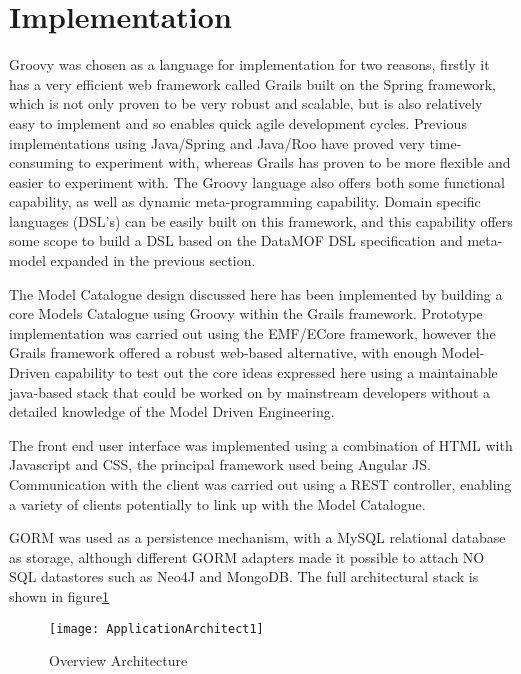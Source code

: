 \section{Implementation}

Groovy was chosen as a language for implementation for two reasons, firstly it has a very efficient web framework called Grails built on the Spring framework, which is not only proven to be very robust and scalable, but is also relatively easy to implement and so enables quick agile development cycles. Previous implementations using Java/Spring and Java/Roo have proved very time-consuming to experiment with, whereas Grails has proven to be more flexible and easier to experiment with. The Groovy language also offers both some functional capability, as well as dynamic meta-programming capability. Domain specific languages (DSL’s) can be easily built on this framework, and this capability offers some scope to build a DSL based on the DataMOF DSL specification and meta-model expanded in the previous section.
 
The Model Catalogue design discussed here has been implemented by building a core Models Catalogue using Groovy within the Grails framework. Prototype implementation was carried out using the EMF/ECore framework, however the Grails framework offered a robust web-based alternative, with enough Model-Driven capability to test out the core ideas expressed here using a maintainable java-based stack that could be worked on by mainstream developers without a detailed knowledge of the Model Driven Engineering. 

The front end user interface was implemented using a combination of HTML with Javascript and CSS, the principal framework used being Angular JS. Communication with the client was carried out using a REST controller, enabling a variety of clients potentially to link up with the Model Catalogue.

GORM was used as a persistence mechanism, with a MySQL relational database as storage, although different GORM adapters made it possible to attach NO SQL datastores such as Neo4J and MongoDB. The full architectural stack is shown in figure\ref{fig:ApplicationArchitectMDR}


\begin{figure}[here]
	\texttt{[image: ApplicationArchitect1]}
	\caption{Overview Architecture} 
	\label{fig:ApplicationArchitectMDR}
\end{figure}

